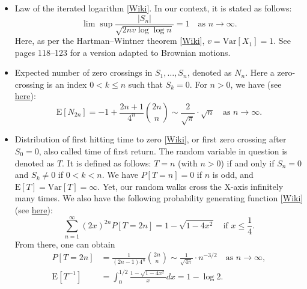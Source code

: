 \documentclass[oneside,10pt]{book}
\begin{document}
\begin{itemize}
\item \textcolor{index}{Law of the iterated logarithm} [\href{https://en.wikipedia.org/wiki/Law_of_the_iterated_logarithm}{Wiki}].
 In our context, it is stated as follows:
\begin{equation}
\lim \sup \frac{|S_n|}{\sqrt{2nv\log \log n}} = 1 \quad \text{as } n\rightarrow \infty.\label{lil12}
\end{equation}
Here, as per the
 \textcolor{index}{Hartman–Wintner theorem} [\href{https://encyclopediaofmath.org/wiki/Law_of_the_iterated_logarithm}{Wiki}],  $v=\text{Var}[X_1]=1$. See~\cite{peresbrown} pages 118--123 for a version adapted to Brownian motions.
\item Expected number of \textcolor{index}{zero crossings} in $S_1,\dots,S_n$, denoted as $N_n$. Here a zero-crossing is an index $0<k\leq n$
 such that $S_k=0$. For $n>0$, we have (see \href{https://math.stackexchange.com/questions/1684576/expected-of-returns-in-a-symmetric-simple-random-walk}{here}):
$$
\text{E}[N_{2n}]=-1+\frac{2n+1}{4^n} \binom{2n}{n}  \sim  \frac{2}{\sqrt{\pi}}\cdot \sqrt{n}  \quad \text{as } n\rightarrow \infty.
$$
\item Distribution of \textcolor{index}{first hitting time} to zero [\href{https://en.wikipedia.org/wiki/First-hitting-time_model}{Wiki}], or
 first zero crossing after $S_0=0$, also called time of first return. The random variable in question is denoted as $T$. It is defined as follows:
$T=n$ (with $n>0$) if and only if $S_{n}=0$ and $S_k\neq 0$ if $0<k<n$. We have $P[T=n]=0$ if $n$ is odd, and $\text{E}[T]=\text{Var}[T]=\infty$. Yet, our random walks cross the X-axis infinitely many times.   We also have the following
 \textcolor{index}{probability generating function} [\href{https://en.wikipedia.org/wiki/Probability-generating_function}{Wiki}] (see \href{https://math.stackexchange.com/questions/64919/biased-random-walk-and-pdf-of-time-of-first-return}{here}):
$$
\sum_{n=1}^\infty  (2x)^{2n} P[T=2n] =1-\sqrt{1-4x^2} \quad \text{if } x\leq \frac{1}{4}.
$$
 From there, one can obtain
\begin{align}
P[T=2n] & =\frac{1}{(2n-1)4^n}\binom{2n}{n}\sim \frac{1}{\sqrt{4\pi}}\cdot n^{-3/2} \quad \text{as } n\rightarrow \infty,\nonumber \\
\text{E}[T^{-1}] & = \int_{0}^{1/2} \frac{1-\sqrt{1-4x^2}}{x}dx = 1-\log 2. \nonumber
\end{align}
\end{itemize}
\end{document}
